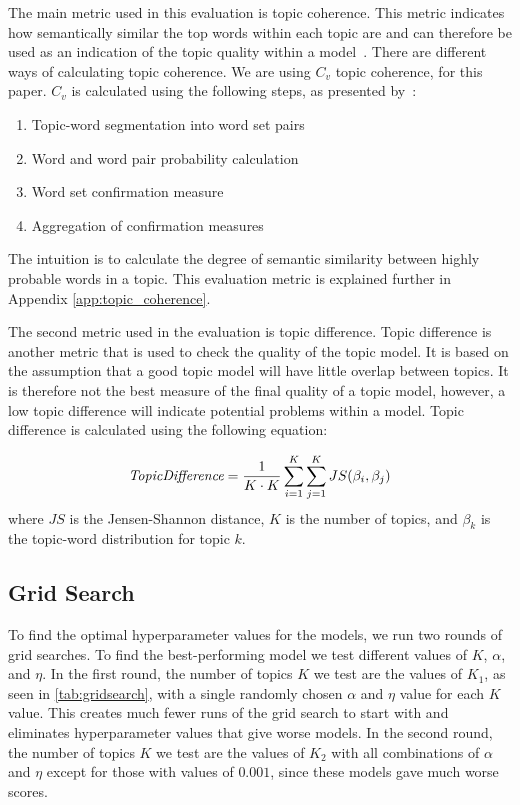 The main metric used in this evaluation is topic coherence.
This metric indicates how semantically similar the top words within each topic are and can therefore be used as an indication of the topic quality within a model~\cite{topic_coherence_2015}.
There are different ways of calculating topic coherence.
We are using $C_v$ topic coherence, for this paper.
$C_v$ is calculated using the following steps, as presented by~\citet{Syed2017coherence}:
\begin{enumerate}
	\item Topic-word segmentation into word set pairs
	\item Word and word pair probability calculation
	\item Word set confirmation measure
	\item Aggregation of confirmation measures
\end{enumerate}
The intuition is to calculate the degree of semantic similarity between highly probable words in a topic.
This evaluation metric is explained further in Appendix \autoref{app:topic_coherence}.

The second metric used in the evaluation is topic difference.
Topic difference is another metric that is used to check the quality of the topic model.
It is based on the assumption that a good topic model will have little overlap between topics.
It is therefore not the best measure of the final quality of a topic model, however, a low topic difference will indicate potential problems within a model.
Topic difference is calculated using the following equation:

\begin{equation}
	\emph{TopicDifference} = \frac{1}{K \cdot K} \sum_{i=1}^{K} \sum_{j=1}^{K} JS(\beta_{i},\beta_{j})
\end{equation}
\noindent where $JS$ is the Jensen-Shannon distance, $K$ is the number of topics, and $\beta_{k}$ is the topic-word distribution for topic $k$.

\subsection{Grid Search}\label{sec:experiment_gridsearch}
To find the optimal hyperparameter values for the models, we run two rounds of grid searches.
To find the best-performing model we test different values of $K$, $\alpha$, and $\eta$.
In the first round, the number of topics $K$ we test are the values of $K_1$, as seen in \autoref{tab:gridsearch}, with a single randomly chosen $\alpha$ and $\eta$ value for each $K$ value.
This creates much fewer runs of the grid search to start with and eliminates hyperparameter values that give worse models.
In the second round, the number of topics $K$ we test are the values of $K_2$ with all combinations of $\alpha$ and $\eta$ except for those with values of $0.001$, since these models gave much worse scores.

